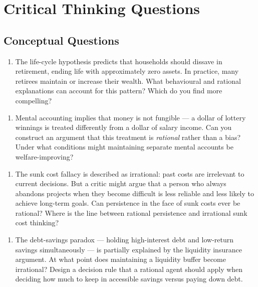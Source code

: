 \documentclass[12pt, letterpaper]{article}
\begin{document}
\medskip


\section*{Critical Thinking Questions}



\subsection{Conceptual Questions}


\begin{enumerate}
\item The life-cycle hypothesis predicts that households should dissave in retirement, ending life with approximately zero assets. In practice, many retirees maintain or increase their wealth. What behavioural and rational explanations can account for this pattern? Which do you find more compelling?
\end{enumerate}

\begin{enumerate}
\item Mental accounting implies that money is not fungible --- a dollar of lottery winnings is treated differently from a dollar of salary income. Can you construct an argument that this treatment is \textit{rational} rather than a bias? Under what conditions might maintaining separate mental accounts be welfare-improving?
\end{enumerate}

\begin{enumerate}
\item The sunk cost fallacy is described as irrational: past costs are irrelevant to current decisions. But a critic might argue that a person who always abandons projects when they become difficult is less reliable and less likely to achieve long-term goals. Can persistence in the face of sunk costs ever be rational? Where is the line between rational persistence and irrational sunk cost thinking?
\end{enumerate}

\begin{enumerate}
\item The debt-savings paradox --- holding high-interest debt and low-return savings simultaneously --- is partially explained by the liquidity insurance argument. At what point does maintaining a liquidity buffer become irrational? Design a decision rule that a rational agent should apply when deciding how much to keep in accessible savings versus paying down debt.
\end{enumerate}
\end{document}

